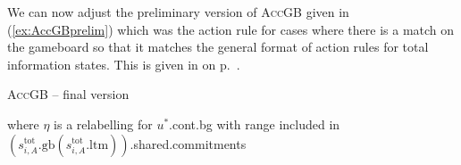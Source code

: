 We can now adjust the preliminary version of \textsc{AccGB} given in
(\ref{ex:AccGBprelim}) which was the action rule for cases where there is a
match on the gameboard so that it matches the general format of action
rules for
total information states.  This is given in \nexteg{} on
p.~\pageref{ex:AccGBfinal}.%
\begin{sidewaysfigure}
\begin{ex} 
  \textsc{AccGB} -- final version
  
\hspace*{-2.5em}
where $\eta$ is a relabelling for $u^*$.cont.bg with range included in $(s_{i,A}^{\text{tot}}.\text{gb}(s_{i,A}^{\text{tot}}.\text{ltm}))$.shared.commitments
\label{ex:AccGBfinal} 
\end{ex}
\end{sidewaysfigure}

